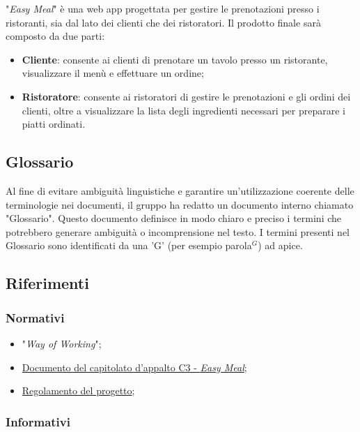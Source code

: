 "\textit{Easy Meal}" è una web app progettata per gestire le prenotazioni
presso i ristoranti, sia dal lato dei clienti che dei ristoratori. Il prodotto
finale sarà composto da due parti:

\begin{itemize}
	\item \textbf{Cliente}: consente ai clienti di prenotare un tavolo presso un
	      ristorante, visualizzare il menù e effettuare un ordine;

	\item \textbf{Ristoratore}: consente ai ristoratori di gestire le
	      prenotazioni e gli ordini dei clienti, oltre a visualizzare la lista
	      degli ingredienti necessari per preparare i piatti ordinati.
\end{itemize}

\subsection{Glossario}

Al fine di evitare ambiguità linguistiche e garantire un'utilizzazione coerente
delle terminologie nei documenti, il gruppo ha redatto un documento interno
chiamato "Glossario". Questo documento definisce in modo chiaro e preciso i
termini che potrebbero generare ambiguità o incomprensione nel testo. I termini
presenti nel Glossario sono identificati da una 'G' (per esempio parola$^G$) ad
apice.

\subsection{Riferimenti}

\subsubsection{Normativi}
\begin{itemize}
	\item "\textit{Way of Working}";
	\item 	\href{https://www.math.unipd.it/~tullio/IS-1/2023/Progetto/C3.pdf}
	      {Documento del capitolato d'appalto C3 - \textit{Easy Meal}};
	\item \href{https://www.math.unipd.it/~tullio/IS-1/2023/Dispense/PD2.pdf}
	      {Regolamento del progetto};
\end{itemize}

\subsubsection{Informativi}

